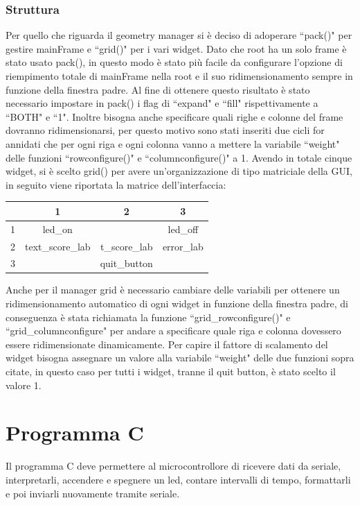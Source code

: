 \documentclass[a4paper]{article}
\begin{document}
\subsubsection{Struttura}
Per quello che riguarda il geometry manager si è deciso di adoperare ``pack()" per gestire mainFrame e ``grid()" per i vari widget. Dato che root ha un solo frame è stato usato pack(), in questo modo è stato più facile da configurare l'opzione di riempimento totale di mainFrame nella root e il suo ridimensionamento sempre in funzione della finestra padre. Al fine di ottenere questo risultato è stato necessario impostare in pack() i flag di ``expand" e ``fill" rispettivamente a ``BOTH" e ``1". Inoltre bisogna anche specificare quali righe e colonne del frame dovranno ridimensionarsi, per questo motivo sono stati inseriti due cicli for annidati che per ogni riga e ogni colonna vanno a mettere la variabile ``weight" delle funzioni ``rowconfigure()" e ``columnconfigure()" a 1. \newline
Avendo in totale cinque widget, si è scelto grid() per avere un'organizzazione di tipo matriciale della GUI, in seguito viene riportata la matrice dell'interfaccia:
\begin{table}[H]
	
	\renewcommand{\arraystretch}{3}
	
	\centering
	\begin{tabular}{l|c|c|c}
	     & 1 & 2 & 3 \\ \hline
		1  \qquad \qquad  &led\_on & \qquad & led\_off  \qquad \qquad \\ \hline
		2 & text\_score\_lab & t\_score\_lab & error\_lab \\ \hline
		3 & \qquad & quit\_button & \qquad
	\end{tabular}
\end{table}
\noindent
Anche per il manager grid è necessario cambiare delle variabili per ottenere un ridimensionamento automatico di ogni widget in funzione della finestra padre, di conseguenza è stata richiamata la funzione ``grid\_rowconfigure()" e ``grid\_columnconfigure" per andare a specificare quale riga e colonna dovessero essere ridimensionate dinamicamente. Per capire il fattore di scalamento del widget bisogna assegnare un valore alla variabile  ``weight" delle due funzioni sopra citate, in questo caso per tutti i widget, tranne il quit button, è stato scelto il valore 1.

\section{Programma C}
Il programma C deve permettere al microcontrollore di ricevere dati da seriale, interpretarli, accendere e spegnere un led, contare intervalli di tempo, formattarli e poi inviarli nuovamente tramite seriale.
\end{document}
